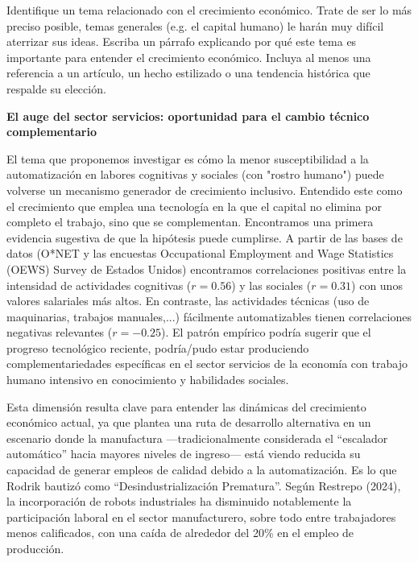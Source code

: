 \documentclass{article}
\theoremstyle{remark}
\theoremstyle{definition}
\begin{document}
Identifique un tema relacionado con el crecimiento económico. Trate de ser lo más preciso posible, temas generales (e.g. el capital humano) le harán muy difícil aterrizar sus ideas. Escriba un párrafo explicando por qué este tema es importante para entender el crecimiento económico. Incluya al menos una referencia a un artículo, un hecho estilizado o una tendencia histórica que respalde su elección.



\begin{tcolorbox}
    
\textbf{El auge del sector servicios: oportunidad para el cambio técnico complementario}


El tema que proponemos investigar es cómo la menor susceptibilidad a la automatización en labores cognitivas y sociales (con "rostro humano") puede volverse un mecanismo generador de crecimiento inclusivo. Entendido este como el crecimiento que emplea una tecnología en la que el capital no elimina por completo el trabajo, sino que se complementan. 
Encontramos una primera evidencia sugestiva de que la hipótesis puede cumplirse.
A partir de las bases de datos (O*NET y las encuestas Occupational Employment and Wage Statistics (OEWS) Survey de Estados Unidos) encontramos correlaciones positivas entre la intensidad de actividades cognitivas ($r=0.56$) y las sociales ($r=0.31$) con unos valores salariales más altos. En contraste, las actividades técnicas (uso de maquinarias, trabajos manuales,...) fácilmente automatizables tienen correlaciones negativas relevantes ($r=-0.25$). El patrón empírico podría sugerir que el progreso tecnológico reciente, podría/pudo estar produciendo complementariedades específicas en el sector servicios de la economía con trabajo humano intensivo en conocimiento y habilidades sociales.


Esta dimensión resulta clave para entender las dinámicas del crecimiento económico actual, ya que plantea una ruta de desarrollo alternativa en un escenario donde la manufactura —tradicionalmente considerada el ``escalador automático'' hacia mayores niveles de ingreso— está viendo reducida su capacidad de generar empleos de calidad debido a la automatización. Es lo que Rodrik bautizó como ``Desindustrialización Prematura''. Según Restrepo (2024), la incorporación de robots industriales ha disminuido notablemente la participación laboral en el sector manufacturero, sobre todo entre trabajadores menos calificados, con una caída de alrededor del 20\% en el empleo de producción. 




\end{tcolorbox}
\end{document}

